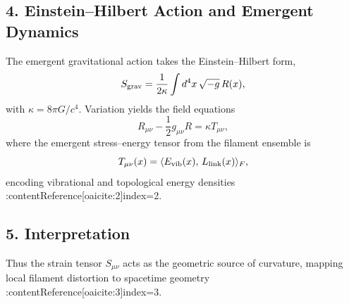 \subsection*{4. Einstein–Hilbert Action and Emergent Dynamics}
The emergent gravitational action takes the Einstein–Hilbert form,
\[
S_{\rm grav} = \frac{1}{2\kappa}\int d^4x\,\sqrt{-g}\,R(x),
\]
with \(\kappa=8\pi G/c^4\). Variation yields the field equations
\[
R_{\mu\nu} - \frac12 g_{\mu\nu} R = \kappa T_{\mu\nu},
\]
where the emergent stress–energy tensor from the filament ensemble is
\[
T_{\mu\nu}(x) = \langle E_{\rm vib}(x),\,L_{\rm link}(x)\rangle_F,
\]
encoding vibrational and topological energy densities :contentReference[oaicite:2]{index=2}.

\subsection*{5. Interpretation}
Thus the strain tensor \(S_{\mu\nu}\) acts as the geometric source of curvature, mapping local filament distortion to spacetime geometry :contentReference[oaicite:3]{index=3}.
